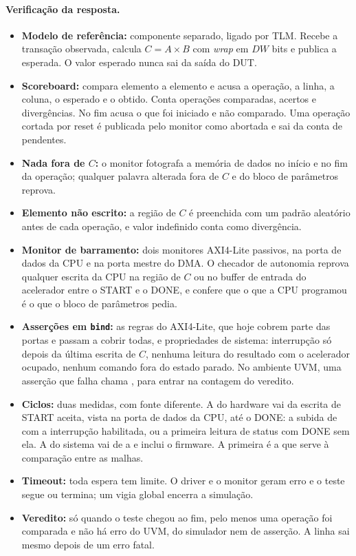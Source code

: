 \documentclass[10pt,a4paper]{article}
\newcommand{\DW}{\mathit{DW}}
\newcommand{\code}[1]{\texttt{\detokenize{#1}}}
\begin{document}
\paragraph{Verificação da resposta.}
\begin{itemize}
  \item \textbf{Modelo de referência:} componente separado, ligado por TLM. Recebe a transação
  observada, calcula $C = A \times B$ com \emph{wrap} em $\DW$ bits e publica a esperada. O valor
  esperado nunca sai da saída do DUT.
  \item \textbf{Scoreboard:} compara elemento a elemento e acusa a operação, a linha, a coluna, o
  esperado e o obtido. Conta operações comparadas, acertos e divergências. No fim acusa o que foi
  iniciado e não comparado. Uma operação cortada por reset é publicada pelo monitor como abortada
  e sai da conta de pendentes.
  \item \textbf{Nada fora de $C$:} o monitor fotografa a memória de dados no início e no fim da
  operação; qualquer palavra alterada fora de $C$ e do bloco de parâmetros reprova.
  \item \textbf{Elemento não escrito:} a região de $C$ é preenchida com um padrão aleatório antes
  de cada operação, e valor indefinido conta como divergência.
  \item \textbf{Monitor de barramento:} dois monitores AXI4-Lite passivos, na porta de dados da CPU
  e na porta mestre do DMA. O checador de autonomia reprova qualquer escrita da CPU na região de
  $C$ ou no buffer de entrada do acelerador entre o START e o DONE, e confere que o que a CPU
  programou é o que o bloco de parâmetros pedia.
  \item \textbf{Asserções em \texttt{bind}:} as regras do AXI4-Lite, que hoje cobrem parte das
  portas e passam a cobrir todas, e propriedades de sistema: interrupção só depois da última
  escrita de $C$, nenhuma leitura do resultado com o acelerador ocupado, nenhum comando fora do
  estado parado. No ambiente UVM, uma asserção que falha chama \code{uvm_error}, para entrar na
  contagem do veredito.
  \item \textbf{Ciclos:} duas medidas, com fonte diferente. A do hardware vai da escrita de START
  aceita, vista na porta de dados da CPU, até o DONE: a subida de \code{irq_o} com a interrupção
  habilitada, ou a primeira leitura de status com DONE sem ela. A do sistema vai de \code{CMD} a
  \code{DONE_COUNT} e inclui o firmware. A primeira é a que serve à comparação entre as malhas.
  \item \textbf{Timeout:} toda espera tem limite. O driver e o monitor geram erro e o teste segue
  ou termina; um vigia global encerra a simulação.
  \item \textbf{Veredito:} \code{TEST PASS} só quando o teste chegou ao fim, pelo menos uma
  operação foi comparada e não há erro do UVM, do simulador nem de asserção. A linha sai mesmo
  depois de um erro fatal.
\end{itemize}
\end{document}
